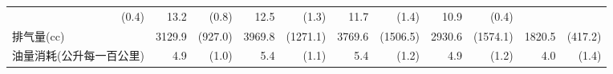 \begin{tabular}{lllllllllll}
  \multicolumn{1}{r}{(0.4)} &
  \multicolumn{1}{r}{13.2} &
  \multicolumn{1}{r}{(0.8)} &
  \multicolumn{1}{r}{12.5} &
  \multicolumn{1}{r}{(1.3)} &
  \multicolumn{1}{r}{11.7} &
  \multicolumn{1}{r}{(1.4)} &
  \multicolumn{1}{r}{10.9} &
  \multicolumn{1}{r}{(0.4)} \\
\multicolumn{1}{l}{排气量(cc)} &
  \multicolumn{1}{r}{3129.9} &
  \multicolumn{1}{r}{(927.0)} &
  \multicolumn{1}{r}{3969.8} &
  \multicolumn{1}{r}{(1271.1)} &
  \multicolumn{1}{r}{3769.6} &
  \multicolumn{1}{r}{(1506.5)} &
  \multicolumn{1}{r}{2930.6} &
  \multicolumn{1}{r}{(1574.1)} &
  \multicolumn{1}{r}{1820.5} &
  \multicolumn{1}{r}{(417.2)} \\
\multicolumn{1}{l}{油量消耗(公升每一百公里)} &
  \multicolumn{1}{r}{4.9} &
  \multicolumn{1}{r}{(1.0)} &
  \multicolumn{1}{r}{5.4} &
  \multicolumn{1}{r}{(1.1)} &
  \multicolumn{1}{r}{5.4} &
  \multicolumn{1}{r}{(1.2)} &
  \multicolumn{1}{r}{4.9} &
  \multicolumn{1}{r}{(1.2)} &
  \multicolumn{1}{r}{4.0} &
  \multicolumn{1}{r}{(1.4)} \\
\cline{1-11}
\end{tabular}
